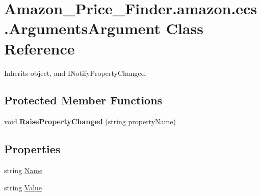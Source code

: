\hypertarget{class_amazon___price___finder_1_1amazon_1_1ecs_1_1_arguments_argument}{\section{Amazon\-\_\-\-Price\-\_\-\-Finder.\-amazon.\-ecs.\-Arguments\-Argument Class Reference}
\label{class_amazon___price___finder_1_1amazon_1_1ecs_1_1_arguments_argument}
}


 




Inherits object, and I\-Notify\-Property\-Changed.

\subsection*{Protected Member Functions}
\begin{DoxyCompactItemize}
\item 
\hypertarget{class_amazon___price___finder_1_1amazon_1_1ecs_1_1_arguments_argument_aa27a901ac8f3e8096a13e020adbd18c4}{void {\bfseries Raise\-Property\-Changed} (string property\-Name)}\label{class_amazon___price___finder_1_1amazon_1_1ecs_1_1_arguments_argument_aa27a901ac8f3e8096a13e020adbd18c4}

\end{DoxyCompactItemize}
\subsection*{Properties}
\begin{DoxyCompactItemize}
\item 
\hypertarget{class_amazon___price___finder_1_1amazon_1_1ecs_1_1_arguments_argument_a9a4d0d134f0e0f4bcf838187279573b7}{string \hyperlink{class_amazon___price___finder_1_1amazon_1_1ecs_1_1_arguments_argument_a9a4d0d134f0e0f4bcf838187279573b7}{Name}}\label{class_amazon___price___finder_1_1amazon_1_1ecs_1_1_arguments_argument_a9a4d0d134f0e0f4bcf838187279573b7}

\begin{DoxyCompactList}\small\item\em \end{DoxyCompactList}\item 
\hypertarget{class_amazon___price___finder_1_1amazon_1_1ecs_1_1_arguments_argument_a6b4c26988f3124600d855d5ee0dcf888}{string \hyperlink{class_amazon___price___finder_1_1amazon_1_1ecs_1_1_arguments_argument_a6b4c26988f3124600d855d5ee0dcf888}{Value}}\label{class_amazon___price___finder_1_1amazon_1_1ecs_1_1_arguments_argument_a6b4c26988f3124600d855d5ee0dcf888}

\begin{DoxyCompactList}\small\item\em \end{DoxyCompactList}\end{DoxyCompactItemize}
